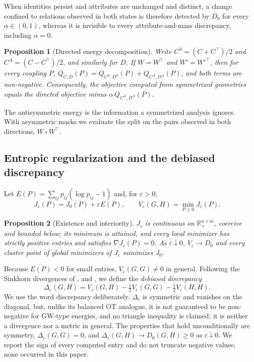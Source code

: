 \documentclass[12pt]{article}
\newtheorem{proposition}{Proposition}
\theoremstyle{definition}
\newcommand{\R}{\mathbb{R}}
\begin{document}
When identities persist and attributes are unchanged and distinct, a change confined to relations observed in both states is therefore detected by $D_0$ for every $\alpha\in(0,1)$, whereas it is invisible to every attribute-and-mass discrepancy, including $\alpha=0$.

\begin{proposition}[Directed energy decomposition]\label{prop:decomp}
Write $C^{S}=(C+C^\top)/2$ and $C^{A}=(C-C^\top)/2$, and similarly for $D$. If $W=W^\top$ and $W'=W'^\top$, then for every coupling $P$, $Q_{C,D}(P)=Q_{C^S,D^S}(P)+Q_{C^A,D^A}(P)$, and both terms are non-negative. Consequently, the objective computed from symmetrized geometries equals the directed objective minus $\alpha\,Q_{C^A,D^A}(P)$.
\end{proposition}

The antisymmetric energy is the information a symmetrized analysis ignores. With asymmetric masks we evaluate the split on the pairs observed in both directions, $W\circ W^\top$.

\subsection{Entropic regularization and the debiased discrepancy}

Let $E(P)=\sum_{ij}p_{ij}(\log p_{ij}-1)$ and, for $\varepsilon>0$,
\begin{equation}\label{eq:Jeps}
J_\varepsilon(P)=J_0(P)+\varepsilon E(P),\qquad V_\varepsilon(G,H)=\min_{P\ge0}J_\varepsilon(P).
\end{equation}

\begin{proposition}[Existence and interiority]\label{prop:exist}
$J_\varepsilon$ is continuous on $\R_+^{n\times m}$, coercive and bounded below; its minimum is attained, and every local minimizer has strictly positive entries and satisfies $\nabla J_\varepsilon(P)=0$. As $\varepsilon\downarrow0$, $V_\varepsilon\to D_0$ and every cluster point of global minimizers of $J_\varepsilon$ minimizes $J_0$.
\end{proposition}

Because $E(P)<0$ for small entries, $V_\varepsilon(G,G)\neq0$ in general. Following the Sinkhorn divergences of \citet{genevay2018learning}, \citet{feydy2019interpolating} and \citet{sejourne2019sinkhorn}, we define the \emph{debiased discrepancy}
\begin{equation}\label{eq:delta}
\Delta_\varepsilon(G,H)=V_\varepsilon(G,H)-\tfrac12V_\varepsilon(G,G)-\tfrac12V_\varepsilon(H,H).
\end{equation}
We use the word discrepancy deliberately. $\Delta_\varepsilon$ is symmetric and vanishes on the diagonal, but, unlike its balanced OT analogue, it is not guaranteed to be non-negative for GW-type energies, and no triangle inequality is claimed; it is neither a divergence nor a metric in general. The properties that hold unconditionally are symmetry, $\Delta_\varepsilon(G,G)=0$, and $\Delta_\varepsilon(G,H)\to D_0(G,H)\ge0$ as $\varepsilon\downarrow0$. We report the sign of every computed entry and do not truncate negative values; none occurred in this paper.
\end{document}
